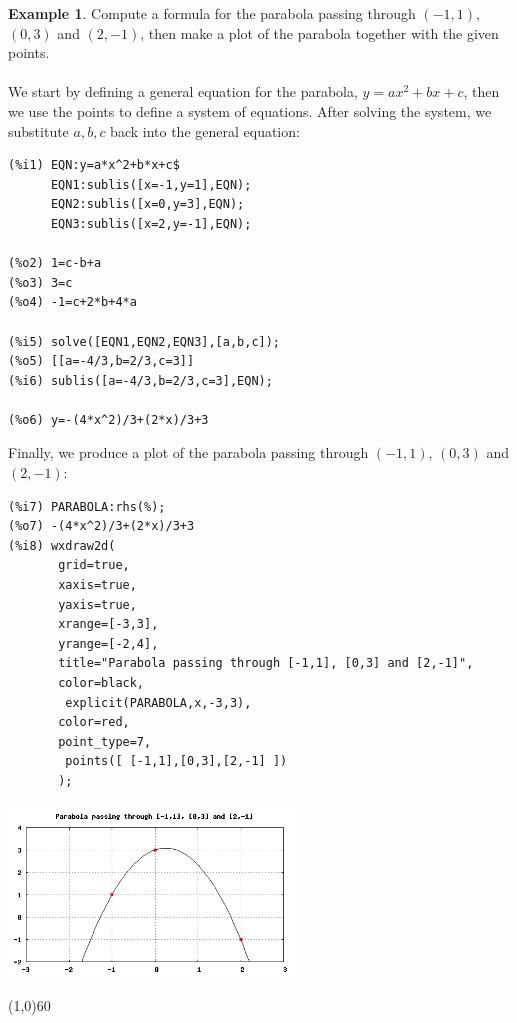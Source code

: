 \documentclass[10.5pt,twoside]{report}
\theoremstyle{definition}
\newtheorem{exmp}{Example}[section]
\begin{document}
\begin{exmp} Compute a formula for the parabola passing through $(-1,1)$, $(0,3)$ and $(2,-1)$, then make a plot of the parabola together with the given points.\\

${}$\\

We start by defining a general equation for the parabola, $y=ax^2+bx+c$, then we use the points to define a system of equations.  After solving the system, we substitute $a,b,c$ back into the general equation:

\begin{verbatim}
(%i1) EQN:y=a*x^2+b*x+c$
      EQN1:sublis([x=-1,y=1],EQN);
      EQN2:sublis([x=0,y=3],EQN);
      EQN3:sublis([x=2,y=-1],EQN);
      
(%o2) 1=c-b+a
(%o3) 3=c
(%o4) -1=c+2*b+4*a

(%i5) solve([EQN1,EQN2,EQN3],[a,b,c]);
(%o5) [[a=-4/3,b=2/3,c=3]]
(%i6) sublis([a=-4/3,b=2/3,c=3],EQN);

(%o6) y=-(4*x^2)/3+(2*x)/3+3
\end{verbatim}

Finally, we produce a plot of the parabola passing through $(-1,1)$, $(0,3)$ and $(2,-1)$:

\begin{verbatim}
(%i7) PARABOLA:rhs(%);
(%o7) -(4*x^2)/3+(2*x)/3+3
(%i8) wxdraw2d(
       grid=true,
       xaxis=true,
       yaxis=true,
       xrange=[-3,3],
       yrange=[-2,4],
       title="Parabola passing through [-1,1], [0,3] and [2,-1]",
       color=black,
        explicit(PARABOLA,x,-3,3),
       color=red,
       point_type=7,
        points([ [-1,1],[0,3],[2,-1] ])
       );
\end{verbatim}

\includegraphics[width=3in]{example_2_3_1_1}
\end{exmp}
\line(1,0){60}
\linethickness{0.5mm}

${}$\\
\end{document}
